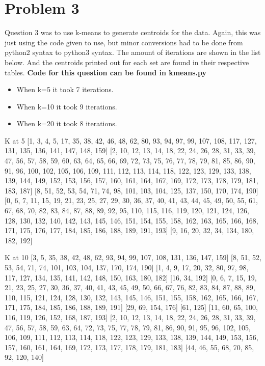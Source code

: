 \documentclass[11pt]{report}
\begin{document}
\pagebreak
\section{Problem 3}
Question 3 was to use k-means to generate centroids for the data. Again, this was just using the code given to use, but minor conversions had to be done from python2 syntax to python3 syntax. The amount of iterations are shown in the list below. And the centroids printed out for each set are found in their respective tables. \textbf{Code for this question can be found in kmeans.py}

\begin{itemize}
\item When k=5 it took 7 iterations. 
\item When k=10 it took 9 iterations.
\item When k=20 it took 8 iterations. 
\end{itemize}
\begin{mylisting}{K at 5}
[1, 3, 4, 5, 17, 35, 38, 42, 46, 48, 62, 80, 93, 94, 97, 99, 107, 108, 117, 127, 131, 135, 136, 141, 147, 148, 159]
[2, 10, 12, 13, 14, 18, 22, 24, 26, 28, 31, 33, 39, 47, 56, 57, 58, 59, 60, 63, 64, 65, 66, 69, 72, 73, 75, 76, 77, 78, 79, 81, 85, 86, 90, 91, 96, 100, 102, 105, 106, 109, 111, 112, 113, 114, 118, 122, 123, 129, 133, 138, 139, 144, 149, 152, 153, 156, 157, 160, 161, 164, 167, 169, 172, 173, 178, 179, 181, 183, 187]
[8, 51, 52, 53, 54, 71, 74, 98, 101, 103, 104, 125, 137, 150, 170, 174, 190]
[0, 6, 7, 11, 15, 19, 21, 23, 25, 27, 29, 30, 36, 37, 40, 41, 43, 44, 45, 49, 50, 55, 61, 67, 68, 70, 82, 83, 84, 87, 88, 89, 92, 95, 110, 115, 116, 119, 120, 121, 124, 126, 128, 130, 132, 140, 142, 143, 145, 146, 151, 154, 155, 158, 162, 163, 165, 166, 168, 171, 175, 176, 177, 184, 185, 186, 188, 189, 191, 193]
[9, 16, 20, 32, 34, 134, 180, 182, 192]
\end{mylisting}
\begin{mylisting}{K at 10}
[3, 5, 35, 38, 42, 48, 62, 93, 94, 99, 107, 108, 131, 136, 147, 159]
[8, 51, 52, 53, 54, 71, 74, 101, 103, 104, 137, 170, 174, 190]
[1, 4, 9, 17, 20, 32, 80, 97, 98, 117, 127, 134, 135, 141, 142, 148, 150, 163, 180, 182]
[16, 34, 192]
[0, 6, 7, 15, 19, 21, 23, 25, 27, 30, 36, 37, 40, 41, 43, 45, 49, 50, 66, 67, 76, 82, 83, 84, 87, 88, 89, 110, 115, 121, 124, 128, 130, 132, 143, 145, 146, 151, 155, 158, 162, 165, 166, 167, 171, 175, 184, 185, 186, 188, 189, 191]
[29, 69, 154, 176]
[61, 125]
[11, 60, 65, 100, 116, 119, 126, 152, 168, 187, 193]
[2, 10, 12, 13, 14, 18, 22, 24, 26, 28, 31, 33, 39, 47, 56, 57, 58, 59, 63, 64, 72, 73, 75, 77, 78, 79, 81, 86, 90, 91, 95, 96, 102, 105, 106, 109, 111, 112, 113, 114, 118, 122, 123, 129, 133, 138, 139, 144, 149, 153, 156, 157, 160, 161, 164, 169, 172, 173, 177, 178, 179, 181, 183]
[44, 46, 55, 68, 70, 85, 92, 120, 140]
\end{mylisting}
\end{document}
